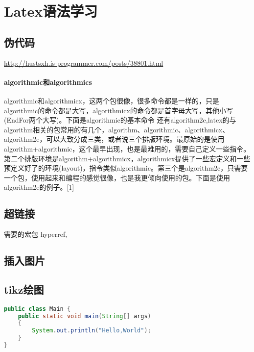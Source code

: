 \section{Latex语法学习}
\subsection{伪代码}
\href{伪代码}{http://hustsxh.is-programmer.com/posts/38801.html}
\paragraph{algorithmic和algorithmics}
algorithmic和algorithmicx，这两个包很像，很多命令都是一样的，只是algorithmic的命令都是大写，algorithmicx的命令都是首字母大写，其他小写(EndFor两个大写)。下面是algorithmic的基本命令
还有algorithm2e,latex的与algorithm相关的包常用的有几个，algorithm、algorithmic、algorithmicx、algorithm2e，可以大致分成三类，或者说三个排版环境。最原始的是使用algorithm+algorithmic，这个最早出现，也是最难用的，需要自己定义一些指令。第二个排版环境是algorithm+algorithmicx，algorithmicx提供了一些宏定义和一些预定义好了的环境(layout)，指令类似algorithmic。第三个是algorithm2e，只需要一个包，使用起来和编程的感觉很像，也是我更倾向使用的包。下面是使用algorithm2e的例子。[1]
\subsection{超链接}
需要的宏包 hyperref, 

\subsection{插入图片}

\subsection{tikz绘图}
\begin{lstlisting}[language={java}]
public class Main {
    public static void main(String[] args)
    {
        System.out.println("Hello,World");
    }
}
\end{lstlisting}